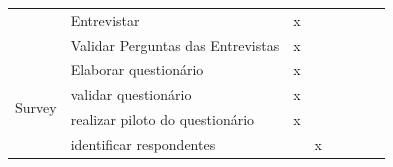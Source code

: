 \begin{table}[]
\begin{center}
\begin{tabular}{|c|l|c|c|c|c|l|l|}
                                                                                        & Entrevistar                                                                                         & x                                      &                       &                       &                       & \multicolumn{1}{c|}{}                   & \multicolumn{1}{c|}{}                   \\ \cline{2-8} 
                                                                                        & Validar Perguntas das Entrevistas                                                                   & x                                      &                       &                       &                       & \multicolumn{1}{c|}{}                   & \multicolumn{1}{c|}{}                   \\ \hline
\multirow{7}{*}{Survey}                                                                 & Elaborar questionário                                                                               & x                                      &                       &                       &                       & \multicolumn{1}{c|}{}                   & \multicolumn{1}{c|}{}                   \\ \cline{2-8} 
                                                                                        & validar questionário                                                                                & x                                      & \multicolumn{1}{l|}{} & \multicolumn{1}{l|}{} & \multicolumn{1}{l|}{} &                                         &                                         \\ \cline{2-8} 
                                                                                        & realizar piloto do questionário                                                                     & x                                      &                       & \multicolumn{1}{l|}{} & \multicolumn{1}{l|}{} &                                         &                                         \\ \cline{2-8} 
                                                                                        & identificar respondentes                                                                            &                                        & x                     & \multicolumn{1}{l|}{} & \multicolumn{1}{l|}{} &                                         &                                         \\ \cline{2-8} 

\end{tabular}
\end{center}
\end{table}
